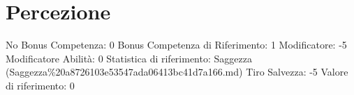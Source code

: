 \section{Percezione}\label{percezione}

\begin{description}
\tightlist
\item[Tags: ABI]
No Bonus Competenza: 0 Bonus Competenza di Riferimento: 1 Modificatore:
-5 Modificatore Abilità: 0 Statistica di riferimento: Saggezza
(Saggezza\%20a8726103e53547ada06413bc41d7a166.md) Tiro Salvezza: -5
Valore di riferimento: 0
\end{description}
